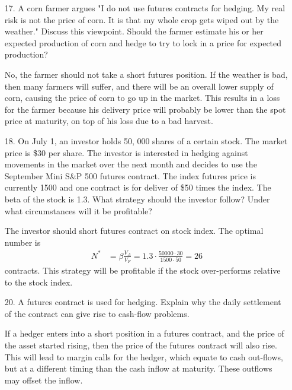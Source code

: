 \documentclass{article}
\begin{document}
\begin{itemize}
	\item[17.] A corn farmer argues "I do not use futures contracts for hedging. My real risk is not the price of corn. It is that my whole crop gets wiped out by the weather." Discuss this viewpoint. Should the farmer estimate his or her expected production of corn and hedge to try to lock in a price for expected production?
		\begin{answer*}
			No, the farmer should not take a short futures position. If the weather is bad, then many farmers will suffer, and there will be an overall lower supply of corn, causing the price of corn to go up in the market. This results in a loss for the farmer because his delivery price will probably be lower than the spot price at maturity, on top of his loss due to a bad harvest.
		\end{answer*}

		\newpage
	\item[18.] On July 1, an investor holds 50, 000 shares of a certain stock. The market price is \$30 per share. The investor is interested in hedging against movements in the market over the next month and decides to use the September Mini S\&P 500 futures contract. The index futures price is currently 1500 and one contract is for deliver of \$50 times the index. The beta of the stock is 1.3. What strategy should the investor follow? Under what circumstances will it be profitable?
		\begin{soln}
			The investor should short futures contract on stock index. The optimal number is
			\begin{align*}
				N^* &= \beta\frac{V_A}{V_F} = 1.3\cdot \frac{50000\cdot 30}{1500\cdot50} = 26
			\end{align*}
			contracts. This strategy will be profitable if the stock over-performs relative to the stock index. 
		\end{soln}

	\item[20.] A futures contract is used for hedging. Explain why the daily settlement of the contract can give rise to cash-flow problems.
		\begin{answer*}
			If a hedger enters into a short position in a futures contract, and the price of the asset started rising, then the price of the futures contract will also rise. This will lead to margin calls for the hedger, which equate to cash out-flows, but at a different timing than the cash inflow at maturity. These outflows may offset the inflow.
		\end{answer*}


\end{itemize}
\end{document}
